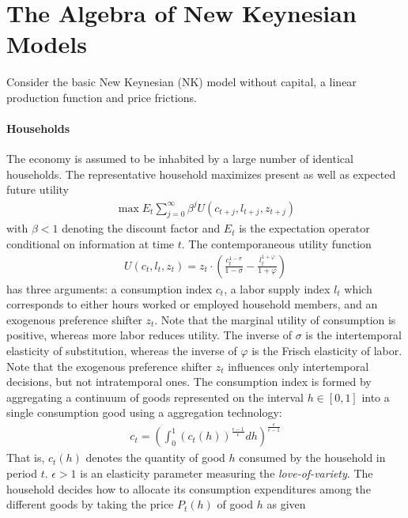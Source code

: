 \section[The Algebra of New Keynesian Models]{The Algebra of New Keynesian Models\label{ex:AlgebraNewKeynesianModels}}
Consider the basic New Keynesian (NK) model without capital, a linear production function and \textcite{Calvo_1983_StaggeredPricesUtilitymaximizing} price frictions.

\paragraph{Households} The economy is assumed to be inhabited by a large number of identical households.
The representative household maximizes present as well as expected future utility
\begin{align*}
\max E_t \sum_{j=0}^{\infty} \beta^{j} U(c_{t+j}, l_{t+j}, z_{t+j})
\end{align*}
with \(\beta <1\) denoting the discount factor and \(E_t\) is the expectation operator conditional on information at time \(t\).
The contemporaneous utility function 
\begin{align*}
U(c_t, l_t, z_t) = z_t \cdot \left( \frac{c_t^{1-\sigma}}{1-\sigma} - \frac{l_t^{1+\varphi}}{1+\varphi} \right)
\end{align*}
has three arguments: a consumption index \(c_t\), a labor supply index \(l_t\) which corresponds to either hours worked or employed household members,
  and an exogenous preference shifter \(z_t\).
Note that the marginal utility of consumption is positive, whereas more labor reduces utility.
The inverse of \(\sigma \) is the intertemporal elasticity of substitution,
  whereas the inverse of \(\varphi \) is the Frisch elasticity of labor.
Note that the exogenous preference shifter \(z_t\) influences only intertemporal decisions, but not intratemporal ones.
The consumption index is formed by aggregating a continuum of goods represented on the interval \(h\in [0,1]\)
  into a single consumption good using a \textcite{Dixit.Stiglitz_1977_MonopolisticCompetitionOptimum} aggregation technology:
\begin{align*}
	c_t = {\left(\int_0^1 {(c_t(h))}^{\frac{\epsilon-1}{\epsilon}} dh \right)}^{\frac{\epsilon}{\epsilon-1}}
\end{align*}
That is, \(c_t(h)\) denotes the quantity of good \(h\) consumed by the household in period \(t\).
\(\epsilon>1\) is an elasticity parameter measuring the \emph{love-of-variety}.
The household decides how to allocate its consumption expenditures among the different goods by taking the price \(P_t(h)\) of good \(h\) as given
